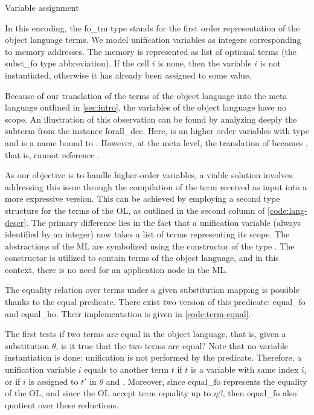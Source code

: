 \documentclass[sigconf,natbib=false]{acmart}
\begin{document}
Variable assignment 

\vspace{30pt}

In this encoding, the fo\_tm type stands for the first order representation of
the object language terms. We model unification variables as integers
corresponding to memory addresses. The memory is represented as list of optional
terms (the subst\_fo type abbreviation). If the cell $i$ is none, then the
variable $i$ is not instantiated, otherwise it has already been assigned to some
value. 

Because of our translation of the terms of the object language into the meta
language outlined in \cref{sec:intro}, the variables of the object language have 
no scope.
An illustration of this observation can be found by analyzing deeply the subterm  from
the instance forall\_dec. Here,  is an higher order variables
with type  and
 is a name bound to .
However, at the meta level, the translation of  becomes , that is,  cannot reference .

As our objective is to handle higher-order variables, a viable solution involves
addressing this issue through the compilation of the term received as input into
a more expressive version. This can be achieved by employing a second type
structure for the terms of the OL, as outlined in the second column of
\cref{code:lang-descr}. The primary difference lies in the fact that a
unification variable (always identified by an integer) now takes a list of terms
representing its scope. The abstractions of the ML are
symbolized using the constructor  of the type . The
constructor  is utilized to contain terms of the object language,
and in this context, there is no need for an application node in the ML.

\def\eqfo{equal\_fo\xspace}
\def\eqho{equal\_ho\xspace}
\def\etabeta{$\eta\beta$\xspace}

The equality relation over terms under a given substitution mapping is possible 
thanks to the equal predicate. There exist
two version of this predicate: \eqfo and \eqho. Their implementation is given in
\cref{code:term-equal}. 

The first tests if two terms are equal in the object language, that is, given a
substitution $\theta$, is it true that the two terms are equal? Note that no
variable instantiation is done: unification is not performed by the
 predicate. Therefore, a unification variable $i$ equals to
another term $t$ if $t$ is a variable with same index $i$, or if $i$ is assigned
to $t'$ in $\theta$ and . Moreover, since \eqfo 
represents the equality of the OL, and since the OL accept term equality up to
\etabeta, then \eqfo also quotient over these reductions.
\end{document}
